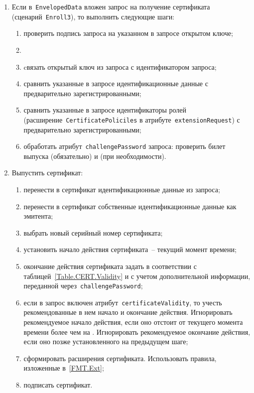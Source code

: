 \begin{enumerate}
\item
Если в~\texttt{EnvelopedData} вложен запрос на получение сертификата
(сценарий~\texttt{Enroll3}), то выполнить следующие шаги:
\begin{enumerate}
\item
проверить подпись запроса на указанном в запросе открытом ключе;
\item
{}
\item
cвязать открытый ключ из запроса с идентификатором запроса;
\item
сравнить указанные в запросе идентификационные данные с предварительно
зарегистрированными;
\item
сравнить указанные в запросе идентификаторы ролей 
(расширение~\texttt{CertificatePoliciles} в 
атрибуте~\texttt{extensionRequest}) с предварительно зарегистрированными; 
\item
обработать атрибут~\texttt{challengePassword} запроса:
проверить билет выпуска (обязательно) и  
 (при необходимости).
\end{enumerate}

\item
Выпустить сертификат:
\begin{enumerate}
\item
перенести в сертификат идентификационные данные из запроса;
\item
перенести в сертификат собственные идентификационные данные как эмитента;
\item
выбрать новый серийный номер сертификата;
\item
установить начало действия сертификата~-- текущий момент времени;
\item
окончание действия сертификата задать в соответствии с 
таблицей~\ref{Table.CERT.Validity} и с учетом дополнительной информации,   
переданной через~\texttt{challengePassword};
\item
если в запрос включен атрибут~\texttt{certificateValidity}, 
то учесть рекомендованные в нем начало и окончание действия. 
Игнорировать рекомендуемое начало действия, если оно отстоит от 
текущего момента времени более чем на . 
Игнорировать рекомендуемое окончание действия, если оно позже 
установленного на предыдущем шаге; 
\item
сформировать расширения сертификата. Использовать правила,
изложенные в~\ref{FMT.Ext};
\item
подписать сертификат.
\end{enumerate}
\end{enumerate}

